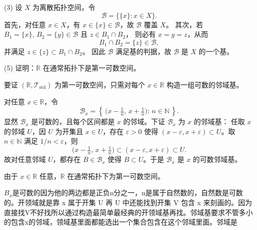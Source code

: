 \begin{solution}
(3)\;
设 $X$ 为离散拓扑空间，令
\[
\mathcal{B}=\bigl\{\{x\}:x\in X\bigr\}.
\]
首先，对任意 $x\in X$，有 $x\in\{x\}\in\mathcal{B}$，故 $\mathcal{B}$ 覆盖 $X$。
其次，若 $B_1=\{x\},\,B_2=\{y\}\in\mathcal{B}$ 且 $z\in B_1\cap B_2$，
则必有 $x=y=z$，从而
\[
B_1\cap B_2=\{z\}\in\mathcal{B},
\]
并满足 $z\in\{z\}\subset B_1\cap B_2$。
因此 $\mathcal{B}$ 满足基的判据，故 $\mathcal{B}$ 是 $X$ 的一个基。
\end{solution}
\begin{exercise}
(5) 证明：$\mathbb{R}$ 在通常拓扑下是第一可数空间。
\end{exercise}
\begin{dxsolution}

要证 $(\mathbb{R},\mathcal{T}_{\mathrm{std}})$ 为第一可数空间，只需对每个 $x\in\mathbb{R}$ 构造一组可数的邻域基。

对任意 $x\in\mathbb{R}$，令
\[
\mathcal{B}_x=\left\{\,\bigl(x-\tfrac{1}{n},\,x+\tfrac{1}{n}\bigr):\, n\in\mathbb{N}\,\right\}.
\]
显然 $\mathcal{B}_x$ 是可数的，且每个区间都是 $x$ 的邻域。下证 $\mathcal{B}_x$ 为 $x$ 的邻域基：  
任取 $x$ 的邻域 $U$，因 $U$ 为开集且 $x\in U$，存在 $\varepsilon>0$ 使得 $(x-\varepsilon,x+\varepsilon)\subset U$。取 $n\in\mathbb{N}$ 满足 $1/n<\varepsilon$，则
\[
\bigl(x-\tfrac{1}{n},\,x+\tfrac{1}{n}\bigr)\subset (x-\varepsilon,x+\varepsilon)\subset U.
\]
故对任意邻域 $U$，都存在 $B\in\mathcal{B}_x$ 使得 $B\subset U$。于是 $\mathcal{B}_x$ 是 $x$ 的可数邻域基。

由于 $x\in\mathbb{R}$ 任意，$\mathbb{R}$ 在通常拓扑下为第一可数空间。

\tcblower
$B_x$是可数的因为他的两边都是正负n分之一，n是属于自然数的，自然数是可数的。开领域就是靠 x 属于开集 U 再 U 中还能找到开集 V 包含 x 来刻画的。因为直接找V不好找所以通过构造最简单最经典的开领域基再找。邻域基要求不管多小的包含x的邻域，领域基里面都能选出一个集合包含在这个邻域里面。邻域是
\end{dxsolution}
